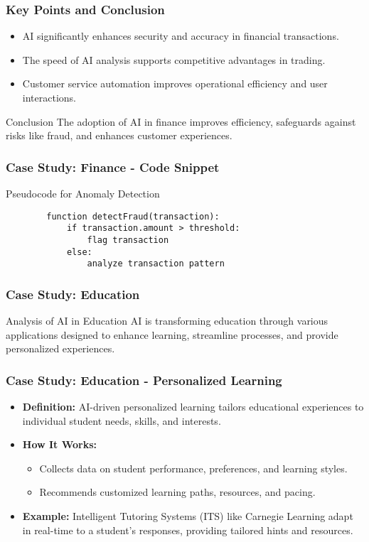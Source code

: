 \documentclass[aspectratio=169]{beamer}
\begin{document}
\begin{frame}[fragile]
    \frametitle{Key Points and Conclusion}
    \begin{itemize}
        \item AI significantly enhances security and accuracy in financial transactions.
        \item The speed of AI analysis supports competitive advantages in trading.
        \item Customer service automation improves operational efficiency and user interactions.
    \end{itemize}
    \begin{block}{Conclusion}
        The adoption of AI in finance improves efficiency, safeguards against risks like fraud, and enhances customer experiences.
    \end{block}
\end{frame}

\begin{frame}[fragile]
    \frametitle{Case Study: Finance - Code Snippet}
    \begin{block}{Pseudocode for Anomaly Detection}
        \begin{lstlisting}
        function detectFraud(transaction):
            if transaction.amount > threshold:
                flag transaction
            else:
                analyze transaction pattern
        \end{lstlisting}
    \end{block}
\end{frame}

\begin{frame}[fragile]
    \frametitle{Case Study: Education}
    \begin{block}{Analysis of AI in Education}
        AI is transforming education through various applications designed to enhance learning, streamline processes, and provide personalized experiences.
    \end{block}
\end{frame}

\begin{frame}[fragile]
    \frametitle{Case Study: Education - Personalized Learning}
    \begin{itemize}
        \item \textbf{Definition:} AI-driven personalized learning tailors educational experiences to individual student needs, skills, and interests.
        \item \textbf{How It Works:} 
          \begin{itemize}
              \item Collects data on student performance, preferences, and learning styles.
              \item Recommends customized learning paths, resources, and pacing.
          \end{itemize}
        \item \textbf{Example:} Intelligent Tutoring Systems (ITS) like Carnegie Learning adapt in real-time to a student's responses, providing tailored hints and resources.
    \end{itemize}
\end{frame}
\end{document}
